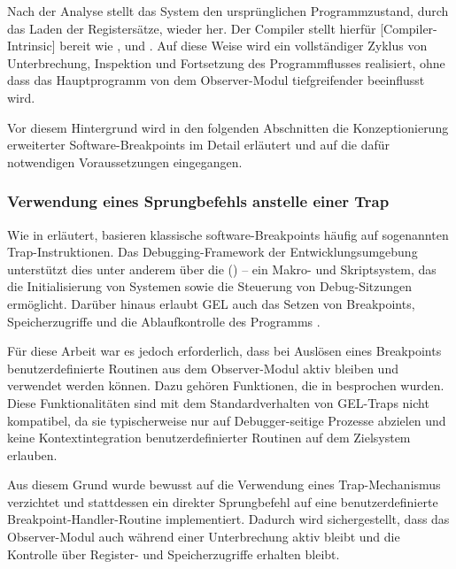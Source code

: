 Nach der Analyse stellt das System den urspr\"unglichen Programmzustand, durch das Laden der Registers\"atze, wieder her. Der Compiler stellt hierf\"ur [Compiler-Intrinsic] bereit wie ,  und . Auf diese Weise wird ein vollst\"andiger Zyklus von Unterbrechung, Inspektion und Fortsetzung des Programmflusses realisiert, ohne dass das Hauptprogramm von dem Observer-Modul tiefgreifender beeinflusst wird. 

Vor diesem Hintergrund wird in den folgenden Abschnitten die Konzeptionierung erweiterter Software-Breakpoints im Detail erl\"autert und auf die daf\"ur notwendigen Voraussetzungen eingegangen.


\newpage
\subsubsection{Verwendung eines Sprungbefehls anstelle einer Trap}
\label{sec:JumpVsTrap}

Wie in  erl\"autert, basieren klassische software-Breakpoints h\"aufig auf sogenannten Trap-Instruktionen. Das Debugging-Framework der Entwicklungsumgebung unterst\"utzt dies unter anderem \"uber die  () – ein Makro- und Skriptsystem, das die Initialisierung von Systemen sowie die Steuerung von Debug-Sitzungen erm\"oglicht. Dar\"uber hinaus erlaubt GEL auch das Setzen von Breakpoints, Speicherzugriffe und die Ablaufkontrolle des Programms .

F\"ur diese Arbeit war es jedoch erforderlich, dass bei Ausl\"osen eines Breakpoints benutzerdefinierte Routinen aus dem Observer-Modul aktiv bleiben und verwendet werden k\"onnen. Dazu geh\"oren Funktionen, die in  besprochen wurden. Diese Funktionalit\"aten sind mit dem Standardverhalten von GEL-Traps nicht kompatibel, da sie typischerweise nur auf Debugger-seitige Prozesse abzielen und keine Kontextintegration benutzerdefinierter Routinen auf dem Zielsystem erlauben.

Aus diesem Grund wurde bewusst auf die Verwendung eines Trap-Mechanismus verzichtet und stattdessen ein direkter Sprungbefehl auf eine benutzerdefinierte Breakpoint-Handler-Routine implementiert. Dadurch wird sichergestellt, dass das Observer-Modul auch w\"ahrend einer Unterbrechung aktiv bleibt und die Kontrolle \"uber Register- und Speicherzugriffe erhalten bleibt.

